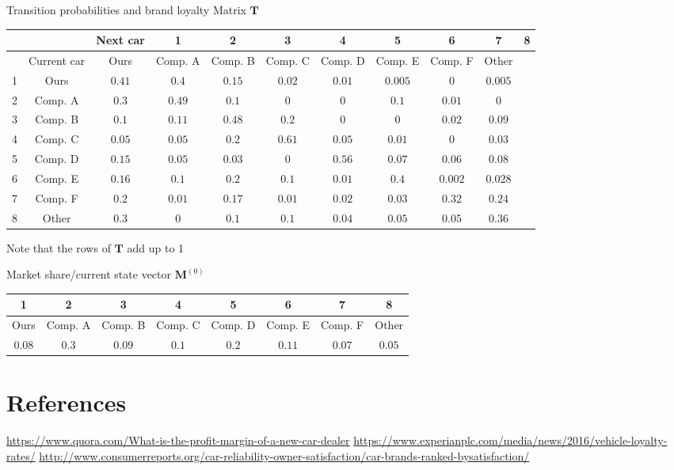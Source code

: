 \documentclass[10pt]{article}
\begin{document}
Transition probabilities and brand loyalty Matrix $\mathbf{T}$

\begin{tabular}{|c|c|c|c|c|c|c|c|c|c|c|}
\cline { 2 - 10 }
 &  & Next car & 1 & 2 & 3 & 4 & 5 & 6 & 7 & 8 \\
\hline
 & Current car & Ours & Comp. A & Comp. B & Comp. C & Comp. D & Comp. E & Comp. F & Other &  \\
\hline
1 & Ours & $0.41$ & $0.4$ & $0.15$ & $0.02$ & $0.01$ & $0.005$ & 0 & $0.005$ &  \\
\hline
2 & Comp. A & $0.3$ & $0.49$ & $0.1$ & 0 & 0 & $0.1$ & $0.01$ & 0 &  \\
\hline
3 & Comp. B & $0.1$ & $0.11$ & $0.48$ & $0.2$ & 0 & 0 & $0.02$ & $0.09$ &  \\
\hline
4 & Comp. C & $0.05$ & $0.05$ & $0.2$ & $0.61$ & $0.05$ & $0.01$ & 0 & $0.03$ &  \\
\hline
5 & Comp. D & $0.15$ & $0.05$ & $0.03$ & 0 & $0.56$ & $0.07$ & $0.06$ & $0.08$ &  \\
\hline
6 & Comp. E & $0.16$ & $0.1$ & $0.2$ & $0.1$ & $0.01$ & $0.4$ & $0.002$ & $0.028$ &  \\
\hline
7 & Comp. F & $0.2$ & $0.01$ & $0.17$ & $0.01$ & $0.02$ & $0.03$ & $0.32$ & $0.24$ &  \\
\hline
8 & Other & $0.3$ & 0 & $0.1$ & $0.1$ & $0.04$ & $0.05$ & $0.05$ & $0.36$ &  \\
\hline
\end{tabular}

Note that the rows of $\mathbf{T}$ add up to 1

Market share/current state vector $\mathbf{M}^{(0)}$

\begin{tabular}{|c|c|c|c|c|c|c|c|}
\hline
1 & 2 & 3 & 4 & 5 & 6 & 7 & 8 \\
\hline
Ours & Comp. A & Comp. B & Comp. C & Comp. D & Comp. E & Comp. F & Other \\
\hline\hline
$0.08$ & $0.3$ & $0.09$ & $0.1$ & $0.2$ & $0.11$ & $0.07$ & $0.05$ \\
\hline
\end{tabular}

\section{References}
\href{https://www.quora.com/What-is-the-profit-margin-of-a-new-car-dealer}{https://www.quora.com/What-is-the-profit-margin-of-a-new-car-dealer} \href{https://www.experianplc.com/media/news/2016/vehicle-loyalty-rates/}{https://www.experianplc.com/media/news/2016/vehicle-loyalty-rates/} \href{http://www.consumerreports.org/car-reliability-owner-satisfaction/car-brands-ranked-bysatisfaction/}{http://www.consumerreports.org/car-reliability-owner-satisfaction/car-brands-ranked-bysatisfaction/}
\end{document}
